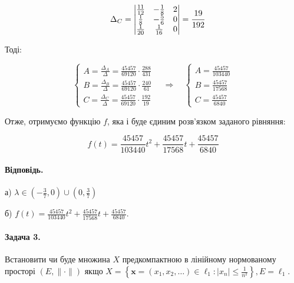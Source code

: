\documentclass[a5paper, 20pt, titlepage]{article}
\newcommand{\x}{\textbf{x}}
\begin{document}
\begin{enumerate}
\vspace{-1mm}
$$
\quad
\Delta_C =  
\begin{vmatrix}
\frac{11}{12} & -\frac{1}{8} & 2 \\
\frac{1}{8}    & -\frac{5}{6} & 0  \\
\frac{1}{20}  & \frac{1}{16} & 0 \\
\end{vmatrix}
= \cfrac{19}{192}
$$

Тоді:

$$
\begin{cases}
A = \frac{\Delta_A}{\Delta} = \frac{45457}{69120} \cdot \frac{288}{431} \\
B = \frac{\Delta_B}{\Delta} = \frac{45457}{69120} \cdot \frac{240}{61}\\
C = \frac{\Delta_C}{\Delta} = \frac{45457}{69120} \cdot \frac{192}{19}
\end{cases}
\quad \Rightarrow \quad 
\begin{cases}
A = \frac{45457}{103440}  \\ 
B = \frac{45457}{17568} \\
C = \frac{45457}{6840}
\end{cases}
$$

\vspace{3mm}
Отже, отримуємо функцію $f$, яка і буде єдиним розв'язком заданого рівняння:

$$f(t) = \frac{45457}{103440} t^2 +  \frac{45457}{17568} t + \frac{45457}{6840}$$ 
\end{enumerate}

\paragraph{Відповідь.} а)  $\lambda \in (-\frac{3}{7}, 0) \cup (0, \frac{3}{7})$ 

\vspace{1mm}
\hspace{16mm}
б) $f(t) = \frac{45457}{103440} t^2 +  \frac{45457}{17568} t + \frac{45457}{6840}$.

\newpage{}

\paragraph{Задача 3.} Встановити чи буде множина $X$ предкомпактною в лінійному нормованому просторі $\left(E, \| \cdot \| \right)$ якщо $X = \left\{  \x = (x_1, x_2, \dots) \in \ell_1: \left| x_n \right| \leqslant \frac{1}{n^2}\right\}, E = \ell_1$. 
\end{document}

